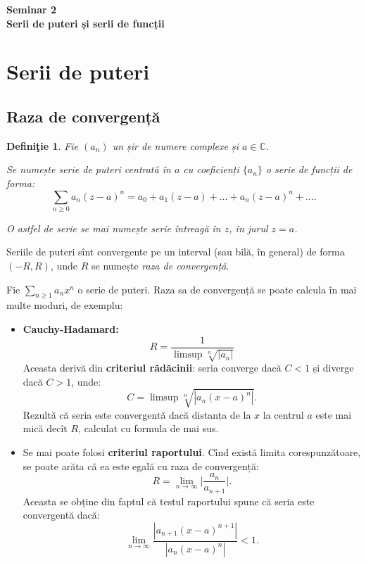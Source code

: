 \documentclass[11pt,a4paper]{article}
\newcommand\ds{\displaystyle}
\theoremstyle{dotless}
\theoremstyle{dotlessdr}
\newtheorem{definition}{Defini\c{t}ie}[section]
\begin{document}

\begin{center}
  {\large\textbf{Seminar 2 \\ Serii de puteri și serii de funcții}}
\end{center}

\section{Serii de puteri}

\subsection{Raza de convergență}

\begin{definition}\label{def:serie-puteri}
  Fie $(a_n)$ un șir de numere complexe și $a \in \mathbb{C}$.

  Se numește \emph{serie de puteri centrată în $a$} cu coeficienți $\{a_n\}$
  o serie de funcții de forma:
  \[
    \sum_{n \geq 0} a_n(z - a)^n = a_0 + a_1(z - a) + \dots + a_n(z - a)^n + \dots.
  \]

  O astfel de serie se mai numește \emph{serie întreagă} în $z$, în jurul $ z = a $.
\end{definition}

Seriile de puteri sînt convergente pe un interval (sau bilă, în general) de
forma $(-R, R)$, unde $R$ se numește \emph{raza de convergență}.

Fie $\ds\sum_{n \geq 1} a_n x^n$ o serie de puteri. Raza sa de convergență
se poate calcula în mai multe moduri, de exemplu:
\begin{itemize}
  \item \textbf{Cauchy-Hadamard:}
    \[
      R = \frac{1}{\limsup \sqrt[n]{|a_n|}}
    \]
    Aceasta derivă din \textbf{criteriul rădăcinii}: seria converge dacă $C < 1$
    și diverge dacă $C > 1$, unde:
    \[
      C = \limsup \sqrt[n]{|a_n(x - a)^n|}.
    \]
    Rezultă că seria este convergentă dacă distanța de la $x$ la centrul $a$
    este mai mică decît $R$, calculat cu formula de mai sus.
  \item Se mai poate folosi \textbf{criteriul raportului}. Cînd există limita
    corespunzătoare, se poate arăta că ea este egală cu raza de convergență:
    \[
      R = \lim_{n \to \infty} \Big| \frac{a_n}{a_{n + 1}} \Big|.
    \]
    Aceasta se obține din faptul că testul raportului spune că seria este
    convergentă dacă:
    \[
      \lim_{n \to \infty} \frac{|a_{n + 1}(x - a)^{n + 1}|}{|a_n(x - a)^n|} < 1.
    \]
\end{itemize}
\end{document}
